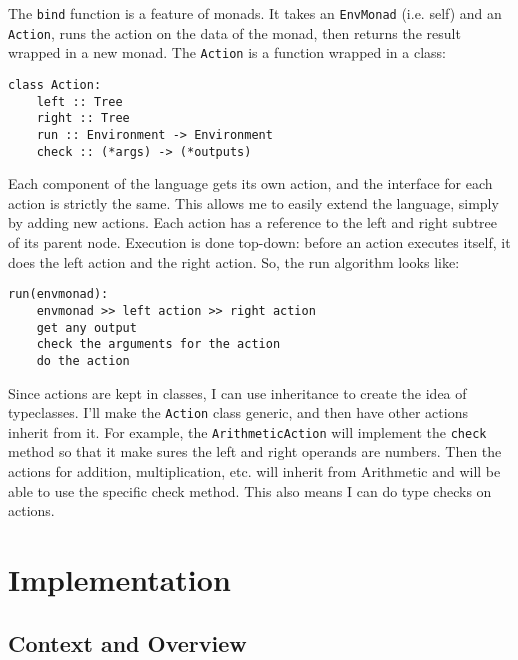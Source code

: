 \documentclass[a4paper, 12pt]{article}
\begin{document}
The \verb|bind| function is a feature of monads. It takes an \verb|EnvMonad| (i.e. self) and an \verb|Action|, runs the action on the data of the monad, then returns the result wrapped in a new monad. The \verb|Action| is a function wrapped in a class:
\begin{verbatim}
class Action:
    left :: Tree
    right :: Tree
    run :: Environment -> Environment
    check :: (*args) -> (*outputs)
\end{verbatim}

Each component of the language gets its own action, and the interface for each action is strictly the same. This allows me to easily extend the language, simply by adding new actions. Each action has a reference to the left and right subtree of its parent node. Execution is done top-down: before an action executes itself, it does the left action and the right action. So, the run algorithm looks like:

\begin{verbatim}
run(envmonad):
    envmonad >> left action >> right action
    get any output
    check the arguments for the action
    do the action
\end{verbatim}

Since actions are kept in classes, I can use inheritance to create the idea of typeclasses. I'll make the \verb|Action| class generic, and then have other actions inherit from it. For example, the \verb|ArithmeticAction| will implement the \verb|check| method so that it make sures the left and right operands are numbers. Then the actions for addition, multiplication, etc. will inherit from Arithmetic and will be able to use the specific check method. This also means I can do type checks on actions.
\\

\section{Implementation}
\subsection{Context and Overview}
\end{document}
